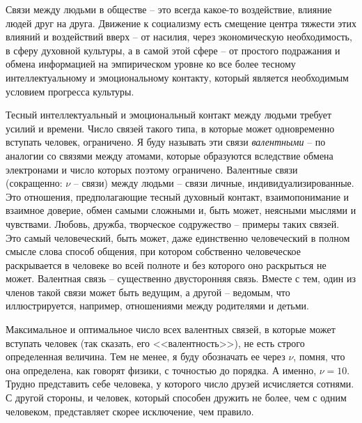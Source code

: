 \documentclass{book}
\begin{document}
Связи между людьми в обществе -- это всегда какое-то воздействие, влияние людей друг на друга. Движение к социализму есть 
смещение центра тяжести этих влияний и воздействий вверх -- от насилия, через экономическую необходимость, в сферу духовной 
культуры, а в самой этой сфере -- от простого подражания и обмена информацией на эмпирическом уровне ко все более тесному 
интеллектуальному и эмоциональному контакту, который является необходимым условием прогресса культуры.

Тесный интеллектуальный и эмоциональный контакт между людьми требует усилий и времени. Число связей такого типа, в которые может 
одновременно вступать человек, ограничено. Я буду называть эти связи \textit{валентными} --  по аналогии со связями между 
атомами, которые образуются вследствие обмена электронами и число которых поэтому ограничено. Валентные связи (сокращенно: $\nu$ 
--  связи) между людьми -- связи личные, индивидуализированные. Это отношения, предполагающие тес­ный духовный контакт, 
взаимопонимание и взаимное доверие, обмен самыми сложными и, быть может, неясными мыслями и чувствами. Любовь, дружба, 
творческое содружество -- при­меры таких связей. Это самый человеческий, быть может, даже единственно человеческий в полном 
смысле слова способ обще­ния, при котором собственно человеческое раскрывается в чело­веке во всей полноте и без которого оно 
раскрыться не может. Валентная связь -- существенно двусторонняя связь. Вместе с тем, один из членов такой связи может быть 
ведущим, а другой -- ведомым, что 
иллюстрируется, например, отношениями между родителями и детьми.

Максимальное и оптимальное число всех валентных связей, в которые может вступать человек (так сказать, его <<валент­ность>>), не 
есть строго определенная величина. Тем не менее, я буду обозначать ее через $\nu$,  помня, что она определена, как го­ворят 
физики, с точностью до порядка. А именно, $\nu = 10$. Трудно представить себе человека, у которого число друзей исчисляется 
сотнями. С другой стороны, и человек, который спо­собен дружить не более, чем с одним человеком, представляет скорее исключение, 
чем правило.
\end{document}
